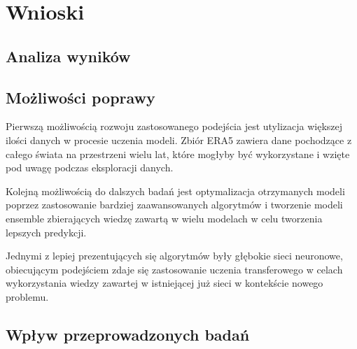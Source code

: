 


\section{Wnioski}

\subsection{Analiza wyników}

\subsection{Możliwości poprawy}

Pierwszą możliwością rozwoju zastosowanego podejścia jest utylizacja większej ilości
danych w procesie uczenia modeli. Zbiór ERA5 zawiera dane pochodzące z całego świata
na przestrzeni wielu lat, które mogłyby być wykorzystane i wzięte pod uwagę podczas
eksploracji danych. 

Kolejną możliwością do dalszych badań jest optymalizacja otrzymanych modeli poprzez 
zastosowanie bardziej zaawansowanych algorytmów i tworzenie modeli ensemble
zbierających wiedzę zawartą w wielu modelach w celu tworzenia lepszych 
predykcji.

Jednymi z lepiej prezentujących się algorytmów były głębokie sieci neuronowe,
obiecującym podejściem zdaje się zastosowanie uczenia transferowego w celach 
wykorzystania wiedzy zawartej w istniejącej już sieci w kontekście nowego problemu.


\subsection{Wpływ przeprowadzonych badań}